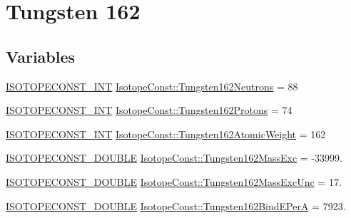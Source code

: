 \hypertarget{group___isotope_const-_tungsten-_w162}{}\section{Tungsten 162}
\label{group___isotope_const-_tungsten-_w162}
\subsection*{Variables}
\begin{DoxyCompactItemize}
\item 
\mbox{\hyperlink{group___isotope_const-_macros_ga5f18360b3e99483a35c32d789e62621c}{I\+S\+O\+T\+O\+P\+E\+C\+O\+N\+S\+T\+\_\+\+I\+NT}} \mbox{\hyperlink{group___isotope_const-_tungsten-_w162_ga604fa73376fe9971109703d15ef65e6b}{Isotope\+Const\+::\+Tungsten162\+Neutrons}} = 88
\item 
\mbox{\hyperlink{group___isotope_const-_macros_ga5f18360b3e99483a35c32d789e62621c}{I\+S\+O\+T\+O\+P\+E\+C\+O\+N\+S\+T\+\_\+\+I\+NT}} \mbox{\hyperlink{group___isotope_const-_tungsten-_w162_gae87fb5990e28e55c3d30fbe3b02aaa25}{Isotope\+Const\+::\+Tungsten162\+Protons}} = 74
\item 
\mbox{\hyperlink{group___isotope_const-_macros_ga5f18360b3e99483a35c32d789e62621c}{I\+S\+O\+T\+O\+P\+E\+C\+O\+N\+S\+T\+\_\+\+I\+NT}} \mbox{\hyperlink{group___isotope_const-_tungsten-_w162_gaea1873fe0e5d19ba12151a6e8ad7e041}{Isotope\+Const\+::\+Tungsten162\+Atomic\+Weight}} = 162
\item 
\mbox{\hyperlink{group___isotope_const-_macros_ga8f45a7272ce02c0b4c65c44636ed719a}{I\+S\+O\+T\+O\+P\+E\+C\+O\+N\+S\+T\+\_\+\+D\+O\+U\+B\+LE}} \mbox{\hyperlink{group___isotope_const-_tungsten-_w162_gadfaed019ec3591c004aa2e4124a57673}{Isotope\+Const\+::\+Tungsten162\+Mass\+Exc}} = -\/33999.
\item 
\mbox{\hyperlink{group___isotope_const-_macros_ga8f45a7272ce02c0b4c65c44636ed719a}{I\+S\+O\+T\+O\+P\+E\+C\+O\+N\+S\+T\+\_\+\+D\+O\+U\+B\+LE}} \mbox{\hyperlink{group___isotope_const-_tungsten-_w162_ga4c147ad9391bec23a42eae1e1ef9716a}{Isotope\+Const\+::\+Tungsten162\+Mass\+Exc\+Unc}} = 17.
\item 
\mbox{\hyperlink{group___isotope_const-_macros_ga8f45a7272ce02c0b4c65c44636ed719a}{I\+S\+O\+T\+O\+P\+E\+C\+O\+N\+S\+T\+\_\+\+D\+O\+U\+B\+LE}} \mbox{\hyperlink{group___isotope_const-_tungsten-_w162_gae8cd7ab6fde927ac0d4ca404db695fba}{Isotope\+Const\+::\+Tungsten162\+Bind\+E\+PerA}} = 7923.
\item 

\end{DoxyCompactItemize}

